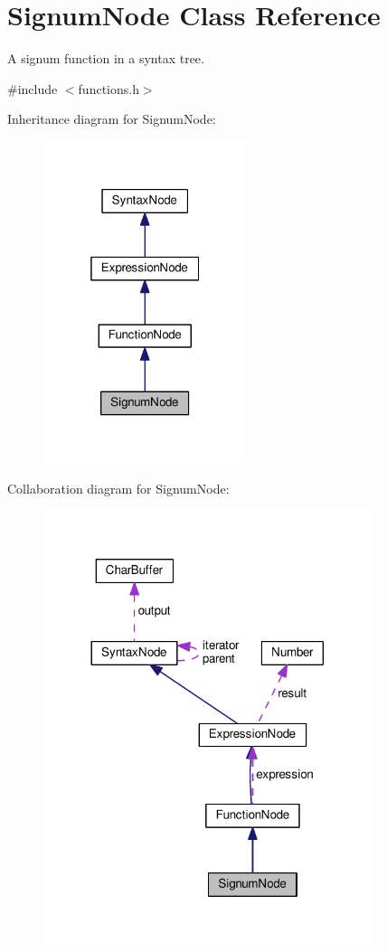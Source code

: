 \hypertarget{classSignumNode}{}\section{Signum\+Node Class Reference}
\label{classSignumNode}


A signum function in a syntax tree.  




{\ttfamily \#include $<$functions.\+h$>$}



Inheritance diagram for Signum\+Node\+:
\nopagebreak
\begin{figure}[H]
\begin{center}
\leavevmode
\includegraphics[width=169pt]{d4/dd3/classSignumNode__inherit__graph}
\end{center}
\end{figure}


Collaboration diagram for Signum\+Node\+:
\nopagebreak
\begin{figure}[H]
\begin{center}
\leavevmode
\includegraphics[width=272pt]{da/d31/classSignumNode__coll__graph}
\end{center}
\end{figure}
